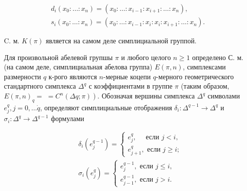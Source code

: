 \documentclass[10pt]{article}
\begin{document}
\[

\begin{gathered}

d_{i}\left(x_{0}: \ldots: x_{n}\right)=\left(x_{0}: \ldots: x_{i-1}: x_{i+1}: \ldots: x_{n}\right), \\

s_{i}\left(x_{0}: \ldots: x_{n}\right)=\left(x_{0}: \ldots: x_{i-1}: x_{i}: x_{i}: x_{i+1}: \ldots: x_{n}\right) .

\end{gathered}

\]



C. м. $K(\pi)$ является на самом деле симплициальной группой.



Для произвольной абелевой групшы $\pi$ и любого целого $n \geqslant 1$ определено С. м. (на самом деле, симплициальная абелова группа) $E(\pi, n)$, симплексами размерности $q$ к-рого являются $n$-мерные коцепи $q$-мерного геометрического стандартного симплекса $\Delta^{q}$ с коэффициентами в группе $\pi$ (таким образом, $E(\pi, n)_{q}=$ $\left.=C^{n}(\Delta q ; \pi)\right)$. Обозначая вершины симплекса $\Delta^{q}$ символами $e_{j}^{q}, j=0, \ldots \dot{q}$, определяют симплициальные отображения $\delta_{i}: \Delta^{q-1} \rightarrow \Delta^{q}$ и $\sigma_{i}: \Delta^{q} \rightarrow \Delta^{q-1}$ формулами



\[

\begin{aligned}

& \delta_{i}\left(e_{j}^{q-1}\right)=\left\{\begin{array}{l}

e_{j}^{q}, \quad \text { если } j<i, \\

e_{j+1}^{q}, \text { если } j \geqslant i ;

\end{array}\right. \\

& \sigma_{i}\left(e_{j}^{q}\right)=\left\{\begin{array}{c}

e_{j}^{q-1}, \text { если } j \leqslant i, \\

e_{j-1}^{q-1}, \text { если } j>i .

\end{array}\right.

\end{aligned}

\]
\end{document}
